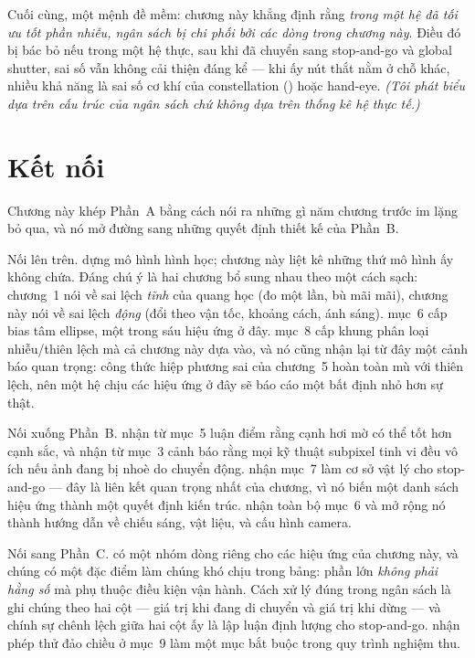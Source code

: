 \documentclass[../../marker.tex]{subfiles}
\begin{document}
Cuối cùng, một mệnh đề mềm: chương này khẳng định rằng \emph{trong một hệ đã tối ưu tốt phần nhiễu, ngân sách bị chi phối bởi các dòng trong chương này}. Điều đó bị bác bỏ nếu trong một hệ thực, sau khi đã chuyển sang stop-and-go và global shutter, sai số vẫn không cải thiện đáng kể --- khi ấy nút thắt nằm ở chỗ khác, nhiều khả năng là sai số cơ khí của constellation () hoặc hand-eye. \emph{(Tôi phát biểu dựa trên cấu trúc của ngân sách chứ không dựa trên thống kê hệ thực tế.)}

\section{Kết nối}

Chương này khép Phần~A bằng cách nói ra những gì năm chương trước im lặng bỏ qua, và nó mở đường sang những quyết định thiết kế của Phần~B.

Nối lên trên.  dựng mô hình hình học; chương này liệt kê những thứ mô hình ấy không chứa. Đáng chú ý là hai chương bổ sung nhau theo một cách sạch: chương~1 nói về sai lệch \emph{tĩnh} của quang học (đo một lần, bù mãi mãi), chương này nói về sai lệch \emph{động} (đổi theo vận tốc, khoảng cách, ánh sáng).  mục~6 cấp bias tâm ellipse, một trong sáu hiệu ứng ở đây.  mục~8 cấp khung phân loại nhiễu/thiên lệch mà cả chương này dựa vào, và nó cũng nhận lại từ đây một cảnh báo quan trọng: công thức hiệp phương sai của chương~5 hoàn toàn mù với thiên lệch, nên một hệ chịu các hiệu ứng ở đây sẽ báo cáo một bất định nhỏ hơn sự thật.

Nối xuống Phần~B.  nhận từ mục~5 luận điểm rằng cạnh hơi mờ có thể tốt hơn cạnh sắc, và nhận từ mục~3 cảnh báo rằng mọi kỹ thuật subpixel tinh vi đều vô ích nếu ảnh đang bị nhoè do chuyển động.  nhận mục~7 làm cơ sở vật lý cho stop-and-go --- đây là liên kết quan trọng nhất của chương, vì nó biến một danh sách hiệu ứng thành một quyết định kiến trúc.  nhận toàn bộ mục~6 và mở rộng nó thành hướng dẫn về chiếu sáng, vật liệu, và cấu hình camera.

Nối sang Phần~C.  có một nhóm dòng riêng cho các hiệu ứng của chương này, và chúng có một đặc điểm làm chúng khó chịu trong bảng: phần lớn \emph{không phải hằng số} mà phụ thuộc điều kiện vận hành. Cách xử lý đúng trong ngân sách là ghi chúng theo hai cột --- giá trị khi đang di chuyển và giá trị khi dừng --- và chính sự chênh lệch giữa hai cột ấy là lập luận định lượng cho stop-and-go.  nhận phép thử đảo chiều ở mục~9 làm một mục bắt buộc trong quy trình nghiệm thu.
\end{document}

